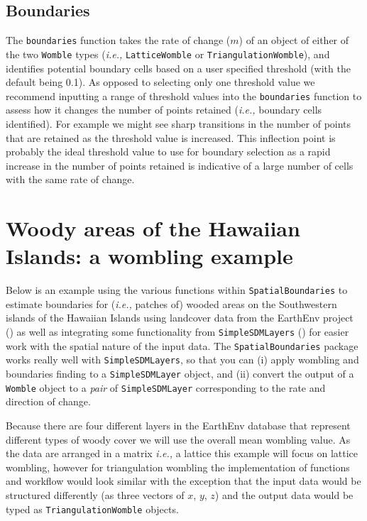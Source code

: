 \begin{refsection}
\subsection{Boundaries}\label{boundaries}

The \texttt{boundaries} function takes the rate of change (\(m\)) of an
object of either of the two \texttt{Womble} types (\emph{i.e.,}
\texttt{LatticeWomble} or \texttt{TriangulationWomble}), and identifies
potential boundary cells based on a user specified threshold (with the
default being 0.1). As opposed to selecting only one threshold value we
recommend inputting a range of threshold values into the
\texttt{boundaries} function to assess how it changes the number of
points retained (\emph{i.e.,} boundary cells identified). For example we
might see sharp transitions in the number of points that are retained as
the threshold value is increased. This inflection point is probably the
ideal threshold value to use for boundary selection as a rapid increase
in the number of points retained is indicative of a large number of
cells with the same rate of change.

\section{Woody areas of the Hawaiian Islands: a wombling
example}\label{woody-areas-of-the-hawaiian-islands-a-wombling-example}

Below is an example using the various functions within
\texttt{SpatialBoundaries} to estimate boundaries for (\emph{i.e.,}
patches of) wooded areas on the Southwestern islands of the Hawaiian
Islands using landcover data from the EarthEnv project
(\cite{Tuanmu2014Glo1km}) as well as integrating some functionality from
\texttt{SimpleSDMLayers} (\cite{Dansereau2021Simplesdmlayers}) for easier work with the spatial nature of the input data. The \texttt{SpatialBoundaries}
package works really well with \texttt{SimpleSDMLayers}, so that you can
(i) apply wombling and boundaries finding to a \texttt{SimpleSDMLayer}
object, and (ii) convert the output of a \texttt{Womble} object to a
\emph{pair} of \texttt{SimpleSDMLayer} corresponding to the rate and
direction of change.

Because there are four different layers in the EarthEnv database that
represent different types of woody cover we will use the overall mean
wombling value. As the data are arranged in a matrix \emph{i.e.,} a
lattice this example will focus on lattice wombling, however for
triangulation wombling the implementation of functions and workflow
would look similar with the exception that the input data would be
structured differently (as three vectors of \(x\), \(y\), \(z\)) and the
output data would be typed as \texttt{TriangulationWomble} objects.


\end{refsection}
